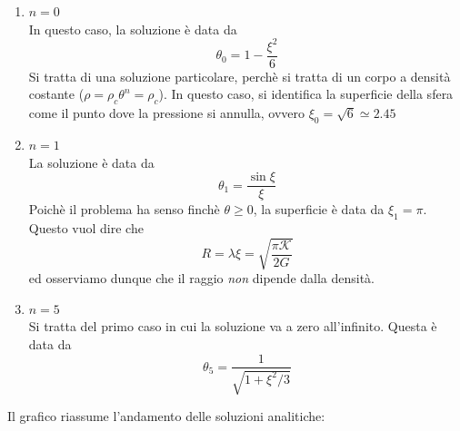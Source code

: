 \documentclass{report}
\begin{document}
\begin{enumerate}
    \item $n=0$ \\
    In questo caso, la soluzione è data da 
    \begin{equation}
        \theta_0 = 1 - \frac{\xi^2}{6}
    \end{equation}
    Si tratta di una soluzione particolare, perchè si tratta di un corpo a densità costante ($\rho = \rho_c\theta^n = \rho_c$). In questo caso, si identifica la superficie della sfera come il punto dove la pressione si annulla, ovvero $\xi_0 = \sqrt{6} \simeq 2.45$
    \item $n=1$ \\
    La soluzione è data da 
    \begin{equation}
        \theta_1 = \frac{\sin{\xi}}{\xi}
    \end{equation}
    Poichè il problema ha senso finchè $\theta \geq 0$, la superficie è data da $\xi_1 = \pi$. Questo vuol dire che 
    \begin{equation}
        R = \lambda\xi = \sqrt{\frac{\pi \mathcal{K}}{2G}}
    \end{equation}
    ed osserviamo dunque che il raggio \emph{non} dipende dalla densità. 
    \item $n=5$ \\
    Si tratta del primo caso in cui la soluzione va a zero all'infinito. Questa è data da 
    \begin{equation}
        \theta_5 = \frac{1}{\sqrt{1 + \xi^2/3}}
    \end{equation}
\end{enumerate}

Il grafico riassume l'andamento delle soluzioni analitiche: 

\vspace{1cm}

\begin{center}
    \end{center}
\end{document}

